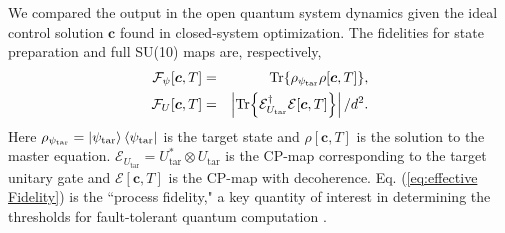 \documentclass[aps,prl,twocolumn,reprint,superscriptaddress,footinbib]{revtex4-2}
\begin{document}
  We compared the output in the open quantum system dynamics given the  ideal control solution $\mathbf{c}$ found in closed-system optimization. The fidelities for state preparation and full SU(10) maps are, respectively,
\begin{eqnarray}
\mathcal{F}_\psi[\bm{c},T] &=& \Tr{\rho_{\psi_\text{tar}} \rho[\bm{c},T]}, \\
\mathcal{F}_U[\bm{c},T] &=& \left|\Tr{\mathcal{E}_{U_\text{tar}}^{\dagger} \mathcal{E}[\bm{c},T]}\right|/d^2.
\label{eq:effective Fidelity}
\end{eqnarray}
Here $\rho_{\psi_\text{tar}}=\ket{\psi_\text{tar}}\bra{\psi_\text{tar}}$ is the target state and $\rho[\bm{c},T]$ is the solution to the master equation.  $\mathcal{E}_{U_\text{tar}} = U_\text{tar}^{*}\otimes U_\text{tar}$ is the CP-map corresponding to the target unitary gate and $\mathcal{E}[\bm{c},T]$ is the CP-map with decoherence.   Eq. (\ref{eq:effective Fidelity}) is the ``process fidelity," a key quantity of interest in determining the thresholds for fault-tolerant quantum computation \cite{schulte2011}.
\end{document}
